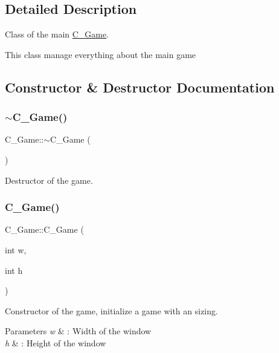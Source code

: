\subsection{Detailed Description}
Class of the main \hyperlink{classC__Game}{C\+\_\+\+Game}. 

This class manage everything about the main game 

\subsection{Constructor \& Destructor Documentation}
\mbox{\label{classC__Game_a4a11981e90a66634568f59ac823a697e}} 
\subsubsection{\texorpdfstring{$\sim$\+C\+\_\+\+Game()}{~C\_Game()}}
{\footnotesize\ttfamily C\+\_\+\+Game\+::$\sim$\+C\+\_\+\+Game (\begin{DoxyParamCaption}{ }\end{DoxyParamCaption})}



Destructor of the game. 

\mbox{\label{classC__Game_ac5a1aba1deb606a281d3992459566716}} 
\subsubsection{\texorpdfstring{C\+\_\+\+Game()}{C\_Game()}}
{\footnotesize\ttfamily C\+\_\+\+Game\+::\+C\+\_\+\+Game (\begin{DoxyParamCaption}\item[{int}]{w,  }\item[{int}]{h }\end{DoxyParamCaption})}



Constructor of the game, initialize a game with an sizing. 


\begin{DoxyParams}{Parameters}
{\em w} & \+: Width of the window \\
\hline
{\em h} & \+: Height of the window \\
\hline
\end{DoxyParams}


